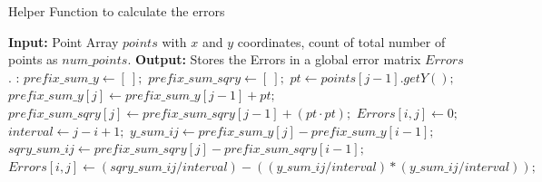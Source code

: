 \documentclass{article}
\begin{document}
\begin{algorithm}
\caption{Helper Function to calculate the errors}
\label{alg:calcehelp}
\begin{algorithmic}[1]
\State \textbf{Input:} Point Array $points$ with $x$ and $y$ coordinates, count of total number of points as $num\_points$.
\State \textbf{Output:} Stores the Errors in a global error matrix $Errors$.
:
\State $prefix\_sum\_y \leftarrow [\ ];$
\State $prefix\_sum\_sqry \leftarrow [\ ];$
\State $pt\leftarrow points[j-1].getY();$
\State $prefix\_sum\_y[j]\leftarrow prefix\_sum\_y[j-1]+pt;$
\State $prefix\_sum\_sqry[j] \leftarrow prefix\_sum\_sqry[j-1] +(pt\cdot pt);$
 \State $Errors[i,j] \leftarrow 0;$ 
 \Else
 \State $interval \leftarrow j-i+1;$ 
 \State $y\_sum\_ij \leftarrow prefix\_sum\_y[j] - prefix\_sum\_y[i-1];$
 \State $sqry\_sum\_ij \leftarrow prefix\_sum\_sqry[j] - prefix\_sum\_sqry[i-1];$
 \State $Errors[i, j] \leftarrow (sqry\_sum\_ij / interval) - ((y\_sum\_ij / interval) * (y\_sum
 \_ij / interval));$
 \EndIf
\EndFor
\EndFor
\EndFunction
\end{algorithmic}
\end{algorithm}
\end{document}
